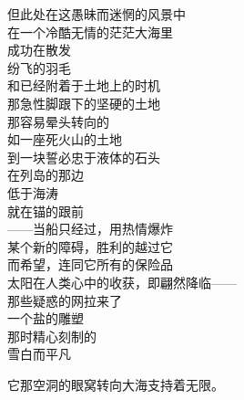 \documentclass{article}
\begin{document}
但此处在这愚昧而迷惘的风景中\\
在一个冷酷无情的茫茫大海里\\
成功在散发\\
纷飞的羽毛\\
和已经附着于土地上的时机\\
那急性脚跟下的坚硬的土地\\
那容易晕头转向的
\\
如一座死火山的土地 \\ 


到一块誓必忠于液体的石头\\
在列岛的那边\\
低于海涛\\
就在锚的跟前\\
——当船只经过，用热情爆炸\\
某个新的障碍，胜利的越过它\\
而希望，连同它所有的保险品\\
太阳在人类心中的收获，即翩然降临——\\
那些疑惑的网拉来了\\
一个盐的雕塑\\
那时精心刻制的\\
雪白而平凡\\
\newpage

它那空洞的眼窝转向大海支持着无限。
\end{document}
